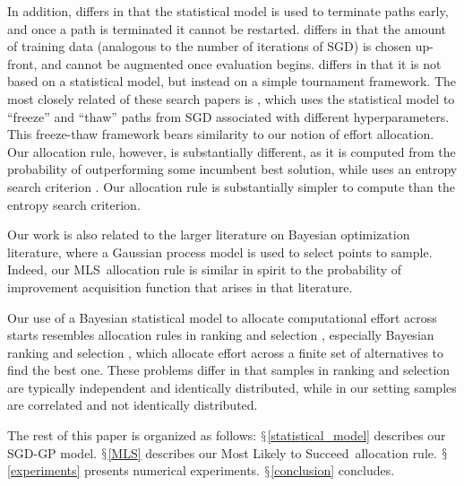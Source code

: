 \documentclass{wscpaperproc}
\newcommand{\pfcomment}[1]{{\color{red} PF: #1}}
\theoremstyle{wsc}
\newcommand{\abbrv}{MLS}
\newcommand{\name}{Most Likely to Succeed}
\begin{document}
In addition,  differs in that the statistical model is used to terminate paths early, and once a path is terminated it cannot be restarted.  differs in that the amount of training data (analogous to the number of iterations of SGD) is chosen up-front, and cannot be augmented once evaluation begins.   differs in that it is not based on a statistical model, but instead on a simple tournament framework.
The most closely related of these search papers is , which uses the statistical model to ``freeze'' and ``thaw'' paths from SGD associated with different hyperparameters.  This freeze-thaw framework bears similarity to our notion of effort allocation.  Our allocation rule, however, is substantially different, as it is computed from the probability of outperforming some incumbent best solution, while  uses an entropy search criterion \cite{entropySearch}.  Our allocation rule is substantially simpler to compute than the entropy search criterion.

Our work is also related to the larger literature on Bayesian optimization \cite{jones1998efficient,forrester2008engineering,brochu2010tutorial,frazier2009knowledge} literature, where a Gaussian process model is used to select points to sample.  Indeed, our \abbrv\ allocation rule is similar in spirit to the probability of improvement acquisition function   that arises in that literature.

Our use of a Bayesian statistical model to allocate computational effort across starts resembles allocation rules in ranking and selection \cite{Bechhofer:1995,kim:2007,kim:20062}, especially Bayesian ranking and selection , which allocate effort across a finite set of alternatives to find the best one.  These problems differ in that samples in ranking and selection are typically independent and identically distributed, while in our setting samples are correlated and not identically distributed.

The rest of this paper is organized as follows: $\mathsection$\ref{statistical_model} describes our SGD-GP model. $\mathsection$\ref{MLS} describes our \name\ allocation rule. $\mathsection$\ref{experiments} presents numerical experiments. $\mathsection$\ref{conclusion} concludes.


\end{document}
